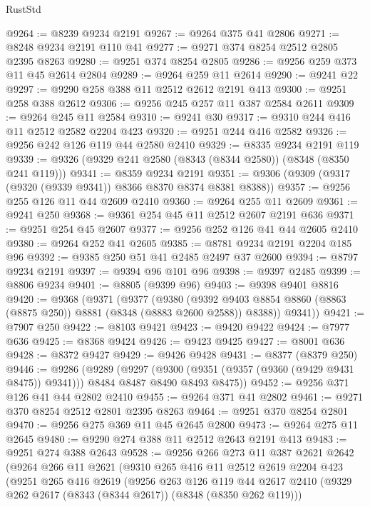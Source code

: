 \begin{lexlean}{RustStd}
\begin{coremodule}
@9264 := @8239 @9234 @2191
@9267 := @9264 @375 @41 @2806
@9271 := @8248 @9234 @2191 @110 @41
@9277 := @9271 @374 @8254 @2512 @2805 @2395 @8263
@9280 := @9251 @374 @8254 @2805
@9286 := @9256 @259 @373 @11 @45 @2614 @2804
@9289 := @9264 @259 @11 @2614
@9290 := @9241 @22
@9297 := @9290 @258 @388 @11 @2512 @2612 @2191 @413
@9300 := @9251 @258 @388 @2612
@9306 := @9256 @245 @257 @11 @387 @2584 @2611
@9309 := @9264 @245 @11 @2584
@9310 := @9241 @30
@9317 := @9310 @244 @416 @11 @2512 @2582 @2204 @423
@9320 := @9251 @244 @416 @2582
@9326 := @9256 @242 @126 @119 @44 @2580 @2410
@9329 := @8335 @9234 @2191 @119
@9339 := @9326 (@9329 @241 @2580 (@8343 (@8344 @2580)) (@8348 (@8350 @241 @119)))
@9341 := @8359 @9234 @2191
@9351 := @9306 (@9309 (@9317 (@9320 (@9339 @9341)) @8366 @8370 @8374 @8381 @8388))
@9357 := @9256 @255 @126 @11 @44 @2609 @2410
@9360 := @9264 @255 @11 @2609
@9361 := @9241 @250
@9368 := @9361 @254 @45 @11 @2512 @2607 @2191 @636
@9371 := @9251 @254 @45 @2607
@9377 := @9256 @252 @126 @41 @44 @2605 @2410
@9380 := @9264 @252 @41 @2605
@9385 := @8781 @9234 @2191 @2204 @185 @96
@9392 := @9385 @250 @51 @41 @2485 @2497 @37 @2600
@9394 := @8797 @9234 @2191
@9397 := @9394 @96 @101 @96
@9398 := @9397 @2485
@9399 := @8806 @9234
@9401 := @8805 (@9399 @96)
@9403 := @9398 @9401 @8816
@9420 := @9368
    (@9371
      (@9377
        (@9380
          (@9392 @9403 @8854 @8860 (@8863 (@8875 @250)) @8881 (@8348 (@8883 @2600 @2588)) @8388))
        @9341))
@9421 := @7907 @250
@9422 := @8103 @9421
@9423 := @9420 @9422
@9424 := @7977 @636
@9425 := @8368 @9424
@9426 := @9423 @9425
@9427 := @8001 @636
@9428 := @8372 @9427
@9429 := @9426 @9428
@9431 := @8377 (@8379 @250)
@9446 := @9286
    (@9289
      (@9297
        (@9300 (@9351 (@9357 (@9360 (@9429 @9431 @8475)) @9341)))
        @8484
        @8487
        @8490
        @8493
        @8475))
@9452 := @9256 @371 @126 @41 @44 @2802 @2410
@9455 := @9264 @371 @41 @2802
@9461 := @9271 @370 @8254 @2512 @2801 @2395 @8263
@9464 := @9251 @370 @8254 @2801
@9470 := @9256 @275 @369 @11 @45 @2645 @2800
@9473 := @9264 @275 @11 @2645
@9480 := @9290 @274 @388 @11 @2512 @2643 @2191 @413
@9483 := @9251 @274 @388 @2643
@9528 := @9256
    @266
    @273
    @11
    @387
    @2621
    @2642
    (@9264
      @266
      @11
      @2621
      (@9310
        @265
        @416
        @11
        @2512
        @2619
        @2204
        @423
        (@9251
          @265
          @416
          @2619
          (@9256
            @263
            @126
            @119
            @44
            @2617
            @2410
            (@9329 @262 @2617 (@8343 (@8344 @2617)) (@8348 (@8350 @262 @119)))

\end{coremodule}
\end{lexlean}
